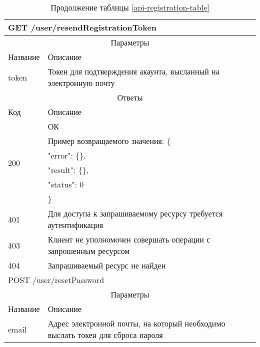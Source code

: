 \begin{table}[H]
  \caption*{Продолжение таблицы \ref{api-registration-table}}
  \begin{tabular}{|p{6cm}|p{10cm}|}
  \hline \multicolumn{2}{|l|}{GET /user/resendRegistrationToken} \\
  \hline \multicolumn{2}{|c|}{Параметры} \\
  \hline Название & Описание \\
  \hline token & Токен для подтверждения акаунта, высланный на электронную почту \\
  \hline \multicolumn{2}{|c|}{Ответы} \\
  \hline Код & Описание \\
  \hline \multirow{6}{=}{200} & ОК \\
   & Пример возвращаемого значения: \{ \\
   & "error": \{\}, \\
   & "result": \{\}, \\
   & "status": 0 \\
   & \} \\
  \hline 401 & Для доступа к запрашиваемому ресурсу требуется аутентификация \\
  \hline 403 & Клиент не уполномочен совершать операции с запрошенным ресурсом \\
  \hline 404 & Запрашиваемый ресурс не найден \\
  \hline \multicolumn{2}{|l|}{POST /user/resetPassword} \\
  \hline \multicolumn{2}{|c|}{Параметры} \\
  \hline Название & Описание \\
  \hline email & Адрес электронной почты, на который необходимо выслать токен для сброса пароля \\
  \end{tabular}
\end{table}
